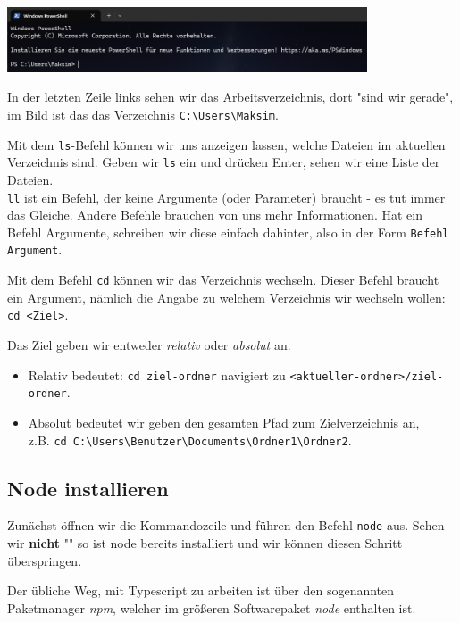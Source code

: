 \documentclass[11pt]{article}
\begin{document}
    \includegraphics[width=0.8\textwidth]{powershell2}

    In der letzten Zeile links sehen wir das Arbeitsverzeichnis, dort "sind wir gerade", im Bild ist das
    das Verzeichnis \Verb"C:\Users\Maksim".

    Mit dem \Verb"ls"-Befehl können wir uns anzeigen lassen, welche Dateien im aktuellen Verzeichnis sind.
    Geben wir \Verb"ls" ein und drücken Enter, sehen wir eine Liste der Dateien. \\

    \Verb"ll" ist ein Befehl, der keine Argumente (oder Parameter) braucht - es tut immer das Gleiche.
    Andere Befehle brauchen von uns mehr Informationen.
    Hat ein Befehl Argumente, schreiben wir diese einfach dahinter, also in der Form \Verb"Befehl Argument".

    Mit dem Befehl \Verb"cd" können wir das Verzeichnis wechseln.
    Dieser Befehl braucht ein Argument, nämlich die Angabe zu welchem Verzeichnis wir wechseln wollen: \Verb"cd <Ziel>".

    Das Ziel geben wir entweder \textit{relativ} oder \textit{absolut} an.
    \begin{itemize}
        \item Relativ bedeutet: \Verb"cd ziel-ordner" navigiert zu \Verb"<aktueller-ordner>/ziel-ordner".
        \item Absolut bedeutet wir geben den gesamten Pfad zum Zielverzeichnis an, \\
              z.B. \Verb"cd C:\Users\Benutzer\Documents\Ordner1\Ordner2".
    \end{itemize}

    \subsection{Node installieren}

    Zunächst öffnen wir die Kommandozeile und führen den Befehl \Verb"node" aus.
    Sehen wir \textbf{nicht} "\color{red}{... : Die Benennung ... wurde nicht als Name eines Cmdlet,
        einer Funktion, einer Skriptdatei oder eines ausführbaren Programms erkannt.}" so ist node bereits
    installiert und wir können diesen Schritt überspringen.

    Der übliche Weg, mit Typescript zu arbeiten ist über den sogenannten Paketmanager \textit{npm},
    welcher im größeren Softwarepaket \textit{node} enthalten ist.
\end{document}
